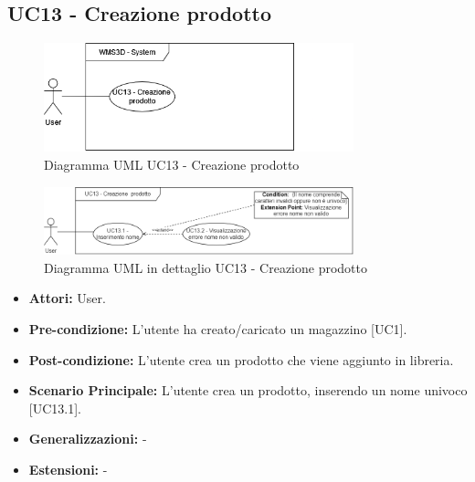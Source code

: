 \subsection{UC13 - Creazione prodotto}
\begin{figure}[H]
  \centering
  \includegraphics[width=0.8\textwidth]{UC_diagrams_11-20/UC13_sys.drawio.png}
   \caption{Diagramma UML UC13 - Creazione prodotto}
\end{figure}
\begin{figure}[H]
  \centering
  \includegraphics[width=0.8\textwidth]{UC_diagrams_11-20/UC13.drawio.png}
   \caption{Diagramma UML in dettaglio UC13 - Creazione prodotto}
\end{figure}
\begin{itemize}
    \item \textbf{Attori:} User.
    \item \textbf{Pre-condizione:}  L'utente ha creato/caricato un magazzino [UC1].
    \item \textbf{Post-condizione:} L'utente crea un prodotto che viene aggiunto in libreria.
    \item \textbf{Scenario Principale:}  L'utente crea un prodotto, inserendo un nome univoco [UC13.1].
    \item \textbf{Generalizzazioni:} -
    \item \textbf{Estensioni:} -
\end{itemize}


